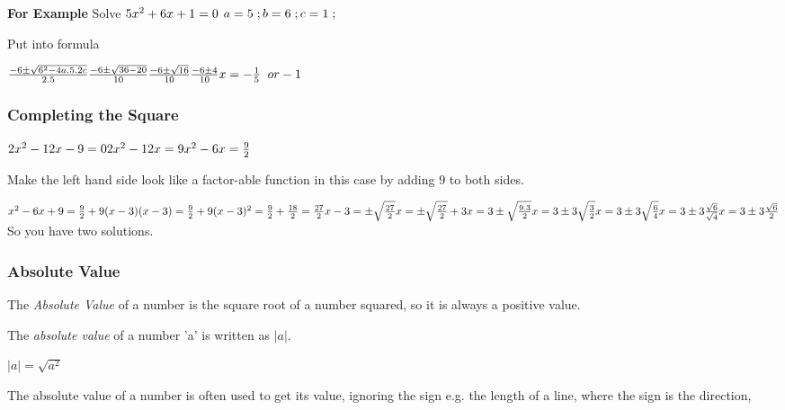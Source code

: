 \documentclass{article}
\begin{document}
\textbf{For Example} 
Solve $5x^{2} + 6x + 1 = 0\\$
$a = 5\;; b = 6\;; c = 1\;;\\$

Put into formula

$\frac{-6 \pm \sqrt{6^{2}-4a.5.2c}}{2.5}\\
\frac{-6 \pm \sqrt{36-20}}{10}\\
\frac{-6 \pm \sqrt{16}}{10} \\
\frac{-6 \pm 4}{10} \\
x = -\frac{1}{5}\;\; or -1\\$





\subsubsection{Completing the Square}
$2x^{2} - 12x - 9 = 0\\
2x^{2} - 12x = 9 \\
x^{2} -6x = \frac{9}{2}$

Make the left hand side look like a factor-able function in this case by adding $9$ to both sides.

$x^{2} -6x  + 9 = \frac{9}{2} + 9\\
(x-3) (x -3) = \frac{9}{2} + 9\\ 
(x-3)^{2} = \frac{9}{2} + \frac{18}{2} = \frac{27}{2}\\
x-3 = \pm \sqrt{\frac{27}{2}} \\
x = \pm \sqrt{\frac{27}{2}} + 3 \\
x = 3 \pm \sqrt{\frac{9 . 3}{2}} \\
x = 3 \pm 3\sqrt{\frac{3}{2}} \\ 
x = 3 \pm 3\sqrt{\frac{6}{4}} \\ 
x = 3 \pm 3\frac{\sqrt{6}}{\sqrt{4}} \\ 
x = 3 \pm 3\frac{\sqrt{6}}{2} $ So you have two solutions.


\subsubsection{Absolute Value}
The \textit{Absolute Value} of a number is the square root of a number squared, so it is always a positive value. 

The \textit{absolute value} of a number 'a' is written as $|a|$.

$ |a| = \sqrt{a^{2}}$ 

The absolute value of a number is often used to get its value, ignoring the sign e.g. the length of a line, where the sign is the direction,
\end{document}
